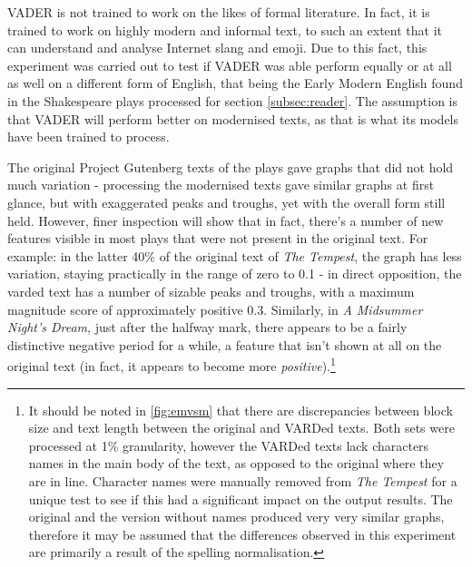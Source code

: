 \documentclass{article}
\begin{document}
{        VADER is not trained to work on the likes of formal literature. In fact, it is trained to work on highly modern and informal text, to such an extent that it can understand and analyse Internet slang and emoji. Due to this fact, this experiment was carried out to test if VADER was able perform equally or at all as well on a different form of English, that being the Early Modern English found in the Shakespeare plays processed for section \ref{subsec:reader}. The assumption is that VADER will perform better on modernised texts, as that is what its models have been trained to process.
        
        The original Project Gutenberg texts of the plays gave graphs that did not hold much variation - processing the modernised texts gave similar graphs at first glance, but with exaggerated peaks and troughs, yet with the overall form still held. However, finer inspection will show that in fact, there's a number of new features visible in most plays that were not present in the original text. For example: in the latter 40\% of the original text of \textit{The Tempest}, the graph has less variation, staying practically in the range of zero to 0.1 - in direct opposition, the varded text has a number of sizable peaks and troughs, with a maximum magnitude score of approximately positive 0.3. Similarly, in \textit{A Midsummer Night's Dream}, just after the halfway mark, there appears to be a fairly distinctive negative period for a while, a feature that isn't shown at all on the original text (in fact, it appears to become more \textit{positive}).\footnote{It should be noted in \ref{fig:emvsm} that there are discrepancies between block size and text length between the original and VARDed texts. Both sets were processed at 1\% granularity, however the VARDed texts lack characters names in the main body of the text, as opposed to the original where they are in line. Character names were manually removed from \textit{The Tempest} for a unique test to see if this had a significant impact on the output results. The original and the version without names produced very very similar graphs, therefore it may be assumed that the differences observed in this experiment are primarily a result of the spelling normalisation.}

}
\end{document}
